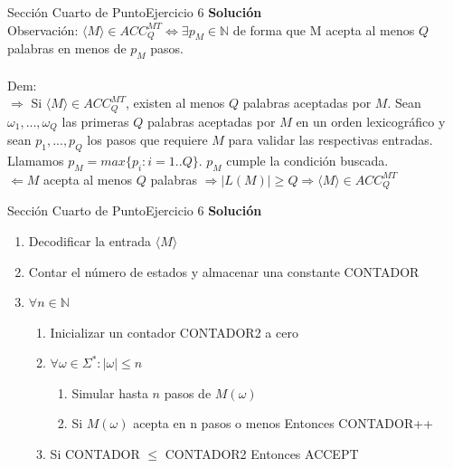 \documentclass[10pt, envcountsect, presentation, aspectratio=169]{beamer}
\begin{document}
\begin{frame}{Sección Cuarto de Punto}{Ejercicio 6}
    \textbf{Solución}\\
    Observación: $\langle M \rangle \in ACC_{Q}^{MT} \Leftrightarrow \exists p_M \in \mathbb{N}$ de forma que M acepta al menos $Q$ palabras en menos de $p_M$ pasos.\\~\\
    Dem:\\
    $\Rightarrow$ Si $\langle M \rangle \in ACC_{Q}^{MT}$, existen al menos $Q$ palabras aceptadas por $M$.
    Sean $\omega_1, ..., \omega_Q$ las primeras $Q$ palabras aceptadas por $M$ en un orden lexicográfico y sean $p_1,...,p_Q$ los pasos que requiere $M$ para validar las respectivas entradas.
    Llamamos $p_M = max\{p_i:i=1..Q\}$. $p_M$ cumple la condición buscada.\\
    $\Leftarrow M$ acepta al menos $Q$ palabras  $\Rightarrow |L(M)| \geq Q \Rightarrow \langle M \rangle \in ACC_{Q}^{MT}$  
\end{frame}
    


\begin{frame}{Sección Cuarto de Punto}{Ejercicio 6}
    \textbf{Solución}\\
    \begin{enumerate}
        \item Decodificar la entrada $\langle M \rangle$
        \item Contar el número de estados y almacenar una constante CONTADOR
        \item $\forall n \in \mathbb{N}$
        \begin{enumerate}
            \item Inicializar un contador CONTADOR2 a cero 
            \item $\forall \omega \in \Sigma^* : |\omega| \leq n$
            \begin{enumerate}
                \item Simular hasta $n$ pasos de $M(\omega)$
                \item Si $M(\omega)$ acepta en n pasos o menos Entonces CONTADOR++
            \end{enumerate}
            \item Si CONTADOR $\leq$ CONTADOR2 Entonces ACCEPT
        \end{enumerate}
    \end{enumerate}
\end{frame}
\end{document}
